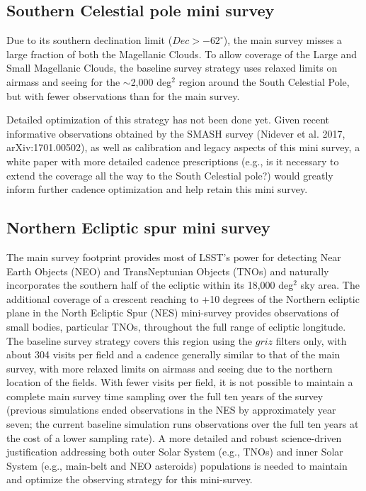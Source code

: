 \documentclass[DM,lsstdraft,toc,usenatbib]{lsstdoc}
\begin{document}
\subsection{Southern Celestial pole mini survey}

Due to its southern declination limit ($Dec > -62^\circ$), the main survey misses a large fraction
of both the Magellanic Clouds. To allow coverage of the Large and Small Magellanic Clouds, the 
baseline survey strategy uses relaxed limits on airmass and seeing for the $\sim$2,000 deg$^2$ region 
around the South Celestial Pole, but with fewer observations than for the main survey. 

Detailed optimization of this strategy has not been done yet. Given recent informative observations 
obtained by the SMASH survey (Nidever et al. 2017, arXiv:1701.00502), as well as calibration 
and legacy aspects of this mini survey, a white paper with more detailed cadence prescriptions
(e.g., is it necessary to extend the coverage all the way to the South Celestial pole?) would greatly 
inform further cadence optimization and help retain this mini survey. 


\subsection{Northern Ecliptic spur mini survey}

The main survey footprint provides most of LSST's power for detecting Near Earth Objects (NEO) and 
TransNeptunian Objects (TNOs) and naturally incorporates the southern half of the ecliptic within its 
18,000 deg$^2$ sky area. The additional coverage of a crescent reaching to +10 degrees of the Northern ecliptic 
plane in the North Ecliptic Spur (NES) mini-survey provides observations of small bodies, particular TNOs, 
throughout the full range of ecliptic longitude. The baseline survey strategy covers this region using the 
$griz$ filters only, with about 304 visits per field and a cadence generally similar to that of the main survey, 
with more relaxed limits on airmass and seeing due to the northern location of the fields. With fewer visits per field,
it is not possible to maintain a complete main survey time sampling over the full ten years of the survey (previous
simulations ended observations in the NES by approximately year seven; the current baseline simulation runs 
observations over the full ten years at the cost of a lower sampling rate). 
A more detailed  and robust science-driven justification addressing both outer Solar System (e.g., TNOs) and inner Solar
System (e.g., main-belt and NEO asteroids) populations is needed to maintain and optimize the observing strategy for this
mini-survey.  
\end{document}
